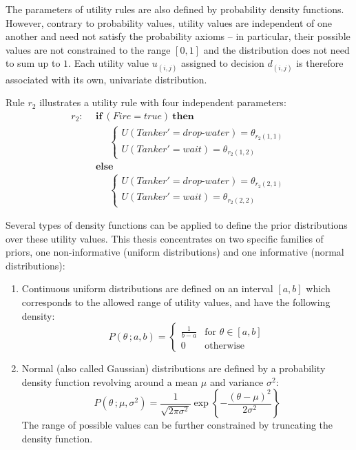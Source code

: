 The parameters of utility rules are also defined by probability density functions.  However, contrary to probability values, utility values are independent of one another and need not satisfy the probability axioms -- in particular, their possible values are not constrained to the range $[0,1]$ and the distribution does not need to sum up to $1$. Each utility value $u_{(i,j)}$ assigned to decision $d_{(i,j)}$ is therefore associated with its own, univariate distribution.

Rule $r_{2}$ illustrates a utility rule with four independent parameters:
\begin{align*}
r_{2}: \ \ & \textbf{if} \ (\mathit{Fire}\!=\!\mathit{true}) \ \textbf{then} \\
& \;\;\;\;\;  \begin{cases}
U(\mathit{Tanker}'\!=\!\mathit{drop\mbox{-}water}) = \theta_{r_{2}(1,1)} \\
U(\mathit{Tanker}'\!=\!\mathit{wait}) = \theta_{r_{2}(1,2)}
\end{cases} \\
& \textbf{else} \\
& \;\;\;\;\; \begin{cases}
U (\mathit{Tanker}'\!=\!\mathit{drop\mbox{-}water}) = \theta_{r_{2}(2,1)} \\
U(\mathit{Tanker}'\!=\!\mathit{wait}) = \theta_{r_{2}(2,2)}
\end{cases}
\end{align*}

Several types of density functions can be applied to define the prior distributions over these utility values.  This thesis concentrates on two specific families of priors, one non-informative (uniform distributions) and one informative (normal distributions):  
\begin{enumerate}
\item Continuous uniform distributions are defined on an interval $[a,b]$ which corresponds to the allowed range of utility values, and have the following density:
\begin{equation}
P(\theta\,; a, b) = \begin{cases}
\frac{1}{b - a} & \text{for } \theta \in [a,b]  \\
0               & \text{otherwise}
\end{cases}
\end{equation}

\item Normal (also called Gaussian) distributions are defined by a probability density function revolving around a mean $\mu$ and variance $\sigma^2$:
\begin{equation}
P(\theta\,; \mu, \sigma^2) = \frac{1}{\sqrt{2\pi\sigma^2}}\operatorname{exp}\left\{-\frac{\left(\theta-\mu\right)^2}{2\sigma^2}\right\}
\end{equation}
The range of possible values can be further constrained by truncating the density function.

\end{enumerate}

